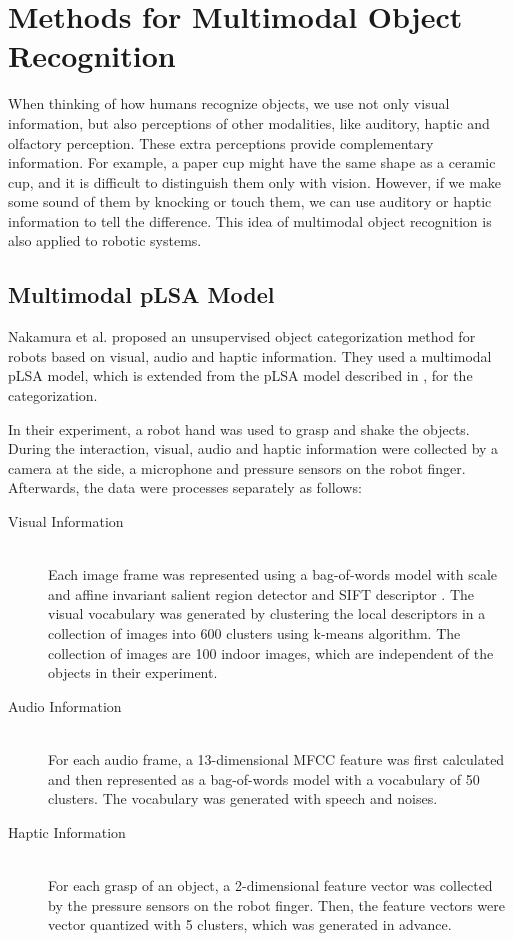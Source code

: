 \documentclass[12pt,final,twoside]{report}
\theoremstyle{plain}
\theoremstyle{definition}
\theoremstyle{remark}
\begin{document}
\cleardoublepage
\chapter{Methods for Multimodal Object Recognition}
When thinking of how humans recognize objects, we use not only visual information, but also perceptions of other modalities, like auditory, haptic and olfactory perception. These extra perceptions provide complementary information. For example, a paper cup might have the same shape as a ceramic cup, and it is difficult to distinguish them only with vision. However, if we make some sound of them by knocking or touch them, we can use auditory or haptic information to tell the difference. This idea of multimodal object recognition is also applied to robotic systems.

\section{Multimodal pLSA Model}
Nakamura et al. \cite{nakamura_multimodal_2007} proposed an unsupervised object categorization method for robots based on visual, audio and haptic information. They used a multimodal pLSA model, which is extended from the pLSA model described in \cite{sivic_discovering_2005}, for the categorization.

In their experiment, a robot hand was used to grasp and shake the objects. During the interaction, visual, audio and haptic information were collected by a camera at the side, a microphone and pressure sensors on the robot finger. Afterwards, the data were processes separately as follows:
\begin{description}
  \item[Visual Information] \hfill \\
    Each image frame was represented using a bag-of-words model with scale and affine invariant salient region detector \cite{mikolajczyk_scale_2004} and SIFT descriptor \cite{lowe_distinctive_2004}. The visual vocabulary was generated by clustering the local descriptors in a collection of images into 600 clusters using k-means algorithm. The collection of images are 100 indoor images, which are independent of the objects in their experiment.
  \item[Audio Information] \hfill \\
    For each audio frame, a 13-dimensional MFCC feature was first calculated and then represented as a bag-of-words model with a vocabulary of 50 clusters. The vocabulary was generated with speech and noises.
  \item[Haptic Information] \hfill \\
    For each grasp of an object, a 2-dimensional feature vector was collected by the pressure sensors on the robot finger. Then, the feature vectors were vector quantized with 5 clusters, which was generated in advance.
\end{description}
\end{document}

